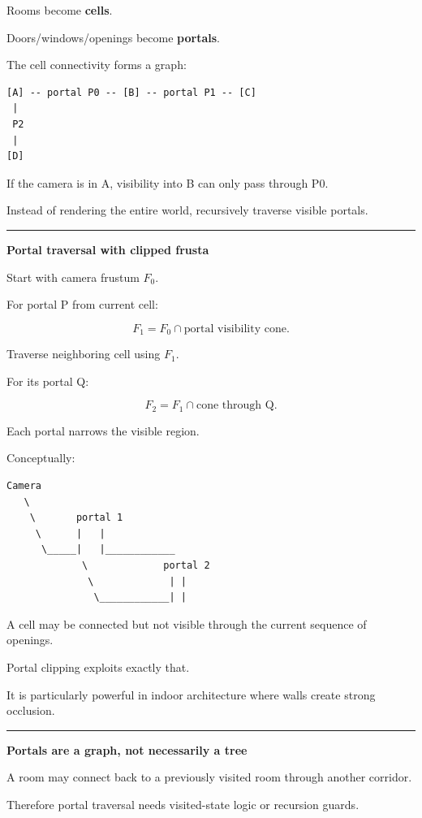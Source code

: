 Rooms become \textbf{cells}.

Doors/windows/openings become \textbf{portals}.

The cell connectivity forms a graph:

\begin{verbatim}
[A] -- portal P0 -- [B] -- portal P1 -- [C]
 |
 P2
 |
[D]
\end{verbatim}

If the camera is in A, visibility into B can only pass through P0.

Instead of rendering the entire world, recursively traverse visible portals.

\begin{center}\rule{0.5\linewidth}{0.5pt}\end{center}

\textbf{Portal traversal with clipped frusta}

Start with camera frustum \(F_0\).

For portal P from current cell:

\[
F_1=
F_0\cap
\text{portal visibility cone}.
\]

Traverse neighboring cell using \(F_1\).

For its portal Q:

\[
F_2=
F_1\cap
\text{cone through Q}.
\]

Each portal narrows the visible region.

Conceptually:

\begin{verbatim}
Camera
   \
    \       portal 1
     \      |   |
      \_____|   |____________
             \             portal 2
              \             | |
               \____________| |
\end{verbatim}

A cell may be connected but not visible through the current sequence of openings.

Portal clipping exploits exactly that.

It is particularly powerful in indoor architecture where walls create strong occlusion.

\begin{center}\rule{0.5\linewidth}{0.5pt}\end{center}

\textbf{Portals are a graph, not necessarily a tree}

A room may connect back to a previously visited room through another corridor.

Therefore portal traversal needs visited-state logic or recursion guards.

